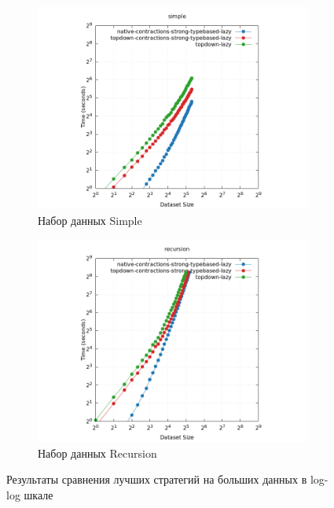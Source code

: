 \documentclass[../thesis.tex]{subfiles}
\begin{document}
\begin{figure}[h]
    \begin{subfigure}{0.5\textwidth}
    \includegraphics[width=\linewidth]{loglog_simple.png} 
    \caption{Набор данных Simple}
    \label{loglog_simple}
    \end{subfigure}
    \begin{subfigure}{0.5\textwidth}
    \includegraphics[width=\linewidth]{loglog_recursion.png}
    \caption{Набор данных Recursion}
    \label{loglog_recursion}
    \end{subfigure}
    \caption{Результаты сравнения лучших стратегий на больших данных в log-log шкале}
    \label{plot_loglog}
\end{figure}
\end{document}

